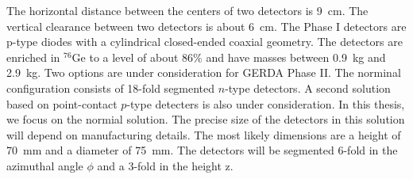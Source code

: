 The horizontal distance between the centers of two detectors is
9~cm. The vertical clearance between two detectors is about 6~cm. The
Phase I detectors are p-type diodes with a cylindrical closed-ended
coaxial geometry. The detectors are enriched in $^{76}$Ge to a level
of about 86\% and have masses between 0.9~kg and 2.9~kg. Two options
are under consideration for GERDA Phase II. The norminal configuration
consists of 18-fold segmented $n$-type detectors. A second solution
based on point-contact $p$-type detecters is also under
consideration. In this thesis, we focus on the normial solution. The
precise size of the detectors in this solution will depend on
manufacturing details. The most likely dimensions are a height of
70~mm and a diameter of 75~mm. The detectors will be segmented 6-fold
in the azimuthal angle $\phi$ and a 3-fold in the height z.

